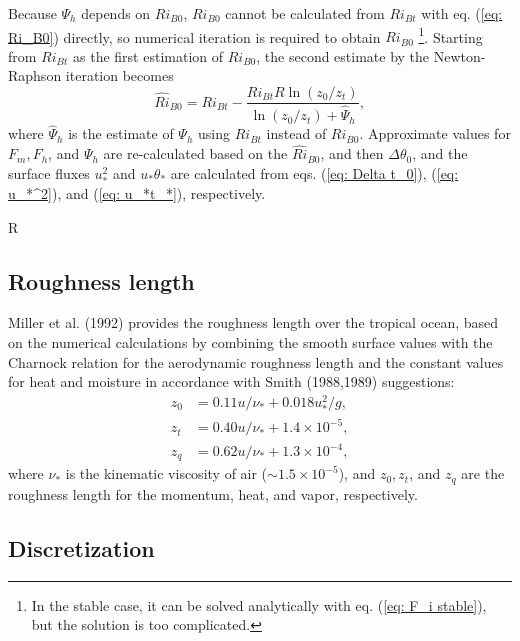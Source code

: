 Because $\Psi_h$ depends on $Ri_{B0}$,
$Ri_{B0}$ cannot be calculated from $Ri_{Bt}$ with eq. (\ref{eq: Ri_B0})
directly,
so numerical iteration is required to obtain $Ri_{B0}$
\footnote{In the stable case, it can be solved analytically
with eq. (\ref{eq: F_i stable}),
but the solution is too complicated.}.
Starting from $Ri_{Bt}$ as the first estimation of $Ri_{B0}$,
the second estimate by the Newton-Raphson iteration becomes
\begin{equation}
  \hat{Ri}_{B0} = Ri_{Bt} - \frac{Ri_{Bt}R\ln(z_0/z_t)}{\ln(z_0/z_t) + \hat{\Psi}_h},
  \label{eq: Ri_B0 estimation}
\end{equation}
where $\hat{\Psi}_h$ is the estimate of $\Psi_h$ using $Ri_{Bt}$ instead of $Ri_{B0}$.
Approximate values for $F_m, F_h$, and $\Psi_h$ are re-calculated
based on the $\hat{Ri}_{B0}$,
and then
$\Delta\theta_0$, and the surface fluxes $u_*^2$ and $u_*\theta_*$
are calculated from eqs. (\ref{eq: Delta t_0}), (\ref{eq: u_*^2}),
and (\ref{eq: u_*t_*}), respectively.


R\subsection{Roughness length}
Miller et al. (1992) provides the roughness length over the tropical ocean,
based on the numerical calculations
by combining the smooth surface values with the Charnock relation
for the aerodynamic roughness length
and the constant values for heat and moisture in accordance with Smith (1988,1989) suggestions:
\begin{align}
  z_0 &= 0.11u/\nu_* + 0.018u_*^2/g, \label{eq: z_0} \\
  z_t &= 0.40u/\nu_* + 1.4 \times 10^{-5}, \label{eq: z_t} \\
  z_q &= 0.62u/\nu_* + 1.3 \times 10^{-4}, \label{eq: z_q}
\end{align}
where $\nu_*$ is the kinematic viscosity of air ($\sim 1.5 \times 10^{-5}$),
and $z_0, z_t$, and $z_q$ are the roughness length
for the momentum, heat, and vapor, respectively.



\subsection{Discretization}

\def\half{\frac{1}{2}}

